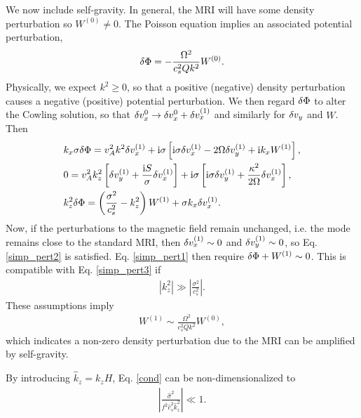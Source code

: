 We now include self-gravity. In general, the MRI will have some
density perturbation so $W^{(0)}\neq0$. The Poisson equation implies
an associated potential perturbation,    
\begin{align} 
  \delta \Phi = -\frac{\Omega^2}{c_s^2 Q k^2} W^{(0)}.
\end{align}
Physically, we expect $k^2\geq0$, so that a positive (negative) density
perturbation causes a negative (positive) potential perturbation. We
then regard $\delta \Phi$ to alter the Cowling solution, so
that $\delta v_x^{0} \to \delta v_x^{0} + \delta v_x^{(1)}$ and similarly for $\delta v_y$ and
$W$. Then 
\begin{align}
  &   k_x\sigma \delta \Phi = v_A^2k^2\delta v_x^{(1)} + \mathrm{i}\sigma\left[\mathrm{i}\sigma
  \delta v_x^{(1)} - 2\Omega\delta v_y^{(1)} + \mathrm{i} k_x W^{(1)}\right], \label{simp_pert1}\\ 
  &  0= v_A^2k_z^2\left[\delta v_y^{(1)} + \frac{\mathrm{i} S
    }{\sigma}\delta v_x^{(1)}\right] + \mathrm{i}\sigma\left[\mathrm{i}\sigma\delta v_y^{(1)} +
  \frac{\kappa^2}{2\Omega}\delta v_x^{(1)}\right],\label{simp_pert2}\\
  & k_z^2\delta \Phi  = \left(\frac{\sigma^2}{c_s^2}-k_z^2\right)W^{(1)} +
  \sigma k_x \delta v_x^{(1)}.\label{simp_pert3} 
\end{align}
Now, if the perturbations to the magnetic field remain
unchanged, i.e. the mode remains close to the standard MRI, then
$\delta v_x^{(1)} \sim 0$ and $\delta v_y^{(1)}\sim0$, so Eq. \ref{simp_pert2} is
satisfied. Eq. \ref{simp_pert1} then require $\delta \Phi +
W^{(1)}\sim0$. This is compatible with Eq. \ref{simp_pert3} if 
\begin{align}
  \left|k_z^2\right| \gg \left|\frac{\sigma^2}{c_s^2}\right|. \label{cond}
\end{align}
These assumptions imply
\begin{align}
  W^{(1)} \sim \frac{\Omega^2}{c_s^2 Q k^2} W^{(0)},\label{feedback}
\end{align} 
which indicates a non-zero density perturbation due to the
MRI can be amplified by self-gravity. 

By introducing $\hat{k}_z=k_zH$, Eq. \ref{cond} can be
non-dimensionalized to 
\begin{align}
  \left|\frac{\hat{\sigma}^2}{f^2\hat{c}_s^2\hat{k}_z^2}\right|\ll 1.  
\end{align}


%  

